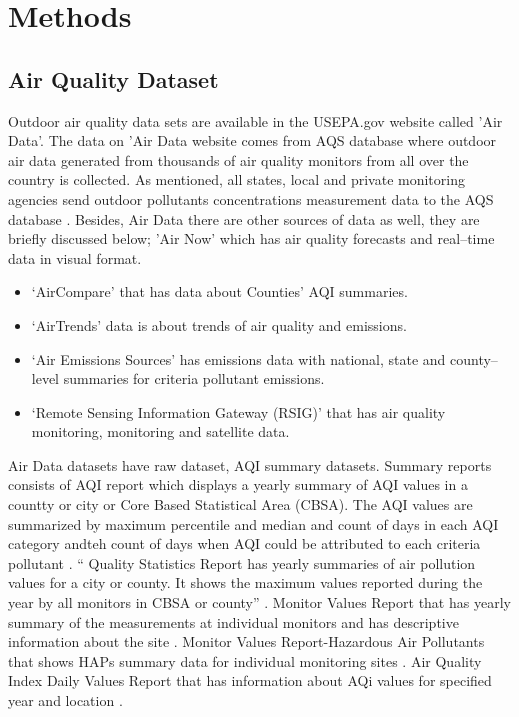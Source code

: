 \documentclass[sigconf]{acmart}
\begin{document}
{  \section{Methods} \subsection{Air Quality Dataset} Outdoor air quality data sets are available in the USEPA.gov website called 'Air Data'. The data on 'Air Data website comes from AQS database where outdoor air data generated from thousands of air quality monitors from all over the country is collected. As mentioned, all states, local and private monitoring agencies send outdoor pollutants concentrations measurement data to the AQS database \cite{epa-gov}. Besides, Air Data there are other sources of data as well, they are briefly discussed below; 'Air Now' which has air quality forecasts and real--time data in visual format. \begin{itemize} \item `AirCompare' that has data about Counties' AQI summaries. \item `AirTrends' data is about trends of air quality and emissions. \item `Air Emissions Sources' has emissions data with national, state and county--level  summaries for criteria pollutant emissions. \item `Remote Sensing Information Gateway (RSIG)' that has air quality monitoring, monitoring and satellite data. \end{itemize}
  Air Data datasets  have raw dataset,  AQI summary datasets. Summary reports consists of AQI report which displays a yearly summary of AQI values in a countty or city or Core Based Statistical Area (CBSA). The AQI values are summarized by maximum percentile and median and count of days in each AQI category andteh count of days when AQI could be attributed to each criteria pollutant \cite{epa-gov}.
  `` Quality Statistics Report has yearly summaries of air pollution values for a city or county. It shows the maximum values reported during the year by all monitors in CBSA or county'' \cite{epa-gov}.
  Monitor Values Report that has yearly summary of the measurements at individual monitors and has descriptive information about the site \cite{epa-gov}.
  Monitor Values Report-Hazardous Air Pollutants that shows HAPs summary data for individual monitoring sites \cite{epa-gov}.
  Air Quality Index Daily Values Report that has information about AQi values for specified year and location \cite{epa-gov}.
}
\end{document}
